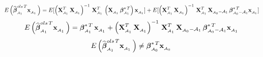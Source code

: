 \documentclass[11pt]{report}
\newcommand{\bfmath}[1]{\mbox{\boldmath$#1$\unboldmath}}
\begin{document}
\begin{enumerate}
$$E\left( \widehat{\bfmath{\beta}}^{ols\,T}_{_{\mathcal{A}_1}}\mathbf{x}_{_{\mathcal{A}_1}}\,\right) = E[\left( \mathbf{X}^{T}_{_{\mathcal{A}_1}}\,\mathbf{X}_{_{\mathcal{A}_1}}\right)^{-1}\,\mathbf{X}^{T}_{_{\mathcal{A}_1}}\,\left(\mathbf{X}_{_{\mathcal{A}_1}}\,\bfmath{\beta}^{\ast\,T}_{_{\mathcal{A}_1}}\right)\mathbf{x}_{_{\mathcal{A}_1}}] + E[\left( \mathbf{X}^{T}_{_{\mathcal{A}_1}}\,\mathbf{X}_{_{\mathcal{A}_1}}\right)^{-1}\,\mathbf{X}^{T}_{_{\mathcal{A}_1}}\,\mathbf{X}_{_{\mathcal{A}_0} - \mathcal{A}_1}\,\bfmath{\beta}^{\ast\,T}_{_{\mathcal{A}_0} - \mathcal{A}_1}\mathbf{x}_{_{\mathcal{A}_1}}]$$
$$E\left( \widehat{\bfmath{\beta}}^{ols\,T}_{_{\mathcal{A}_1}}\mathbf{x}_{_{\mathcal{A}_1}}\,\right) = \bfmath{\beta}^{\ast\,T}_{_{\mathcal{A}_1}}\,\mathbf{x}_{_{\mathcal{A}_1}} + \left( \mathbf{X}^{T}_{_{\mathcal{A}_1}}\,\mathbf{X}_{_{\mathcal{A}_1}}\right)^{-1}\,\mathbf{X}^{T}_{_{\mathcal{A}_1}}\,\mathbf{X}_{_{\mathcal{A}_0} - \mathcal{A}_1}\,\bfmath{\beta}^{\ast\,T}_{_{\mathcal{A}_0} - \mathcal{A}_1}\mathbf{x}_{_{\mathcal{A}_1}}$$
$$E\left( \widehat{\bfmath{\beta}}^{ols\,T}_{_{\mathcal{A}_1}}\mathbf{x}_{_{\mathcal{A}_1}}\,\right) \neq \bfmath{\beta}^{\ast\,T}_{_{\mathcal{A}_0}}\mathbf{x}_{_{\mathcal{A}_0}}\,$$



\end{enumerate}
\end{document}
